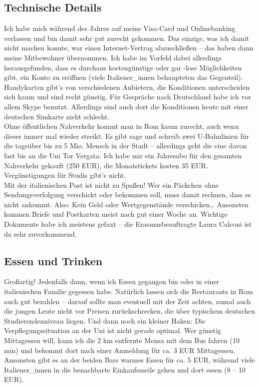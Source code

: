 \documentclass[a4paper,12pt]{article}
\begin{document}
\subsection*{Technische Details}
Ich habe mich während des Jahres auf meine Visa-Card und Onlinebanking verlassen und bin damit sehr gut zurecht gekommen. Das einzige, was ich damit nicht machen konnte, war einen Internet-Vertrag abzuschließen – das haben dann meine Mitbewohner übernommen. Ich habe im Vorfeld dabei allerdings herausgefunden, dass es durchaus kostengünstige oder gar -lose Möglichkeiten gibt, ein Konto zu eröffnen (viele Italiener\_innen behaupteten das Gegenteil). 
Handykarten gibt’s von verschiedenen Anbietern, die Konditionen unterscheiden sich kaum und sind recht günstig. Für Gespräche nach Deutschland habe ich vor allem Skype benutzt. Allerdings sind auch dort die Konditionen heute mit einer deutschen Simkarte nicht schlecht. \\
Ohne öffentlichen Nahverkehr kommt man in Rom kaum zurecht, auch wenn dieser immer mal wieder streikt. Es gibt sage und schreib zwei U-Bahnlinien für die tagsüber bis zu 5 Mio. Mensch in der Stadt – allerdings geht die eine davon fast bis an die Uni Tor Vergata. Ich habe mir ein Jahresabo für den gesamten Nahverkehr gekauft (250 EUR), die Monatstickets kosten 35 EUR. Vergünstigungen für Studis gibt’s nicht. \\
Mit der italienischen Post ist nicht zu Spaßen! Wer ein Päckchen ohne Sendungsverfolgung verschickt oder bekommen soll, muss damit rechnen, dass es nicht ankommt. Also: Kein Geld oder Wertgegenstände verschicken… Ansonsten kommen Briefe und Postkarten meist nach gut einer Woche an. Wichtige Dokumente habe ich meistens gefaxt – die Erasmusbeauftragte Laura Calconi ist da sehr zuvorkommend. 

\subsection*{Essen und Trinken}
Großartig! Jedenfalls dann, wenn ich Essen gegangen bin oder in einer italienischen Familie gegessen habe. Natürlich lassen sich die Restaurants in Rom auch gut bezahlen – darauf sollte man eventuell mit der Zeit achten, zumal auch die jungen Leute nicht vor Preisen zurückschrecken, die über typischem deutschen Studierendenniveau liegen. Und dann noch ein kleiner Haken: Die Verpflegungssituation an der Uni ist nicht gerade optimal. Wer günstig Mittagessen will, kann ich die 2 km entfernte Mensa mit dem Bus fahren (10 min) und bekommt dort nach einer Anmeldung für ca. 3 EUR Mittagessen. Ansonsten gibt es an der beiden Bars warmes Essen für ca. 5 EUR, während viele Italiener\_innen in die benachbarte Einkaufsmeile gehen und dort essen (8 – 10 EUR). 
\end{document}
